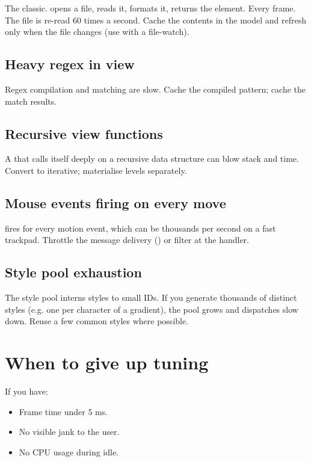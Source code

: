 The classic.  opens a file, reads it, formats it,
returns the element. Every frame. The file is re-read 60 times
a second. Cache the contents in the model and refresh only when
the file changes (use  with a file-watch).

\subsection*{Heavy regex in view}

Regex compilation and matching are slow. Cache the compiled
pattern; cache the match results.

\subsection*{Recursive view functions}

A  that calls itself deeply on a recursive data
structure can blow stack and time. Convert to iterative;
materialise levels separately.

\subsection*{Mouse events firing on every move}

 fires for every motion event, which can be
thousands per second on a fast trackpad. Throttle the message
delivery () or filter at the
handler.

\subsection*{Style pool exhaustion}

The style pool interns styles to small IDs. If you generate
thousands of distinct styles (e.g. one per character of a
gradient), the pool grows and dispatches slow down. Reuse a
few common styles where possible.

\section{When to give up tuning}

If you have:

\begin{itemize}[leftmargin=*]
  \item Frame time under 5 ms.
  \item No visible jank to the user.
  \item No CPU usage during idle.
\end{itemize}

